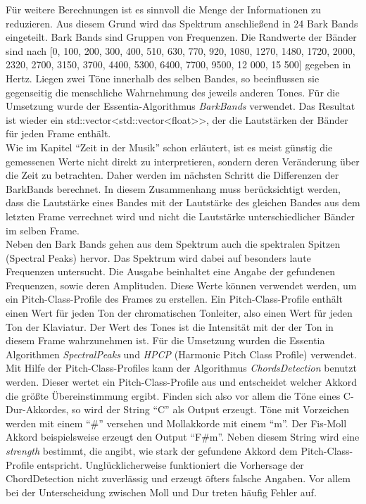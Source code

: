 \documentclass[11pt,a4paper]{article}
\begin{document}
Für weitere Berechnungen ist es sinnvoll die Menge der Informationen zu reduzieren. Aus diesem Grund wird das Spektrum anschließend in 24 Bark Bands eingeteilt. Bark Bands sind Gruppen von Frequenzen. Die Randwerte der Bänder sind nach \cite[S. 3]{smith1999bark} [0, 100, 200, 300, 400, 510, 630, 770, 920, 1080, 1270, 1480, 1720, 2000, 2320, 2700, 3150, 3700, 4400, 5300, 6400, 7700, 9500, 12 000, 15 500] gegeben in Hertz. Liegen zwei Töne innerhalb des selben Bandes, so beeinflussen sie gegenseitig die menschliche Wahrnehmung des jeweils anderen Tones. Für die Umsetzung wurde der Essentia-Algorithmus \textit{BarkBands} verwendet. Das Resultat ist wieder ein std::vector<std::vector<float>\text{}>, der die Lautstärken der Bänder für jeden Frame enthält.\\
Wie im Kapitel ``Zeit in der Musik'' schon erläutert, ist es meist günstig die gemessenen Werte nicht direkt zu interpretieren, sondern deren Veränderung über die Zeit zu betrachten. Daher werden im nächsten Schritt die Differenzen der BarkBands berechnet. In diesem Zusammenhang muss berücksichtigt werden, dass die Lautstärke eines Bandes mit der Lautstärke des gleichen Bandes aus dem letzten Frame verrechnet wird und nicht die Lautstärke unterschiedlicher Bänder im selben Frame.\\
Neben den Bark Bands gehen aus dem Spektrum auch die spektralen Spitzen (Spectral Peaks) hervor. Das Spektrum wird dabei auf besonders laute Frequenzen untersucht. Die Ausgabe beinhaltet eine Angabe der gefundenen Frequenzen, sowie deren Amplituden. Diese Werte können verwendet werden, um ein Pitch-Class-Profile des Frames zu erstellen. Ein Pitch-Class-Profile enthält einen Wert für jeden Ton der chromatischen Tonleiter, also einen Wert für jeden Ton der Klaviatur. Der Wert des Tones ist die Intensität mit der der Ton in diesem Frame wahrzunehmen ist. Für die Umsetzung wurden die Essentia Algorithmen \textit{SpectralPeaks} und \textit{HPCP} (Harmonic Pitch Class Profile) verwendet.\\
Mit Hilfe der Pitch-Class-Profiles kann der Algorithmus \textit{ChordsDetection} benutzt werden. Dieser wertet ein Pitch-Class-Profile aus und entscheidet welcher Akkord die größte Übereinstimmung ergibt. Finden sich also vor allem die Töne eines C-Dur-Akkordes, so wird der String ``C'' als Output erzeugt. Töne mit Vorzeichen werden mit einem ``\#'' versehen und Mollakkorde mit einem ``m''. Der Fis-Moll Akkord beispielsweise erzeugt den Output ``F\#m''. Neben diesem String wird eine \textit{strength} bestimmt, die angibt, wie stark der gefundene Akkord dem Pitch-Class-Profile entspricht. Unglücklicherweise funktioniert die Vorhersage der ChordDetection nicht zuverlässig und erzeugt öfters falsche Angaben. Vor allem bei der Unterscheidung zwischen Moll und Dur treten häufig Fehler auf.
\end{document}
